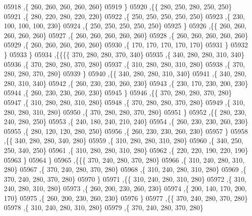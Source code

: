 \begin{DoxyCode}
05918     ,\{   260,   260,   260,   260,   260\}
05919     \}
05920    ,\{\{   280,   250,   280,   250,   250\}
05921     ,\{   280,   220,   280,   220,   220\}
05922     ,\{   250,   250,   250,   250,   250\}
05923     ,\{   230,   100,   100,   100,   230\}
05924     ,\{   250,   250,   250,   250,   250\}
05925     \}
05926    ,\{\{   260,   260,   260,   260,   260\}
05927     ,\{   260,   260,   260,   260,   260\}
05928     ,\{   260,   260,   260,   260,   260\}
05929     ,\{   260,   260,   260,   260,   260\}
05930     ,\{   170,   170,   170,   170,   170\}
05931     \}
05932    \}
05933   \}
05934  ,\{\{\{\{   370,   280,   280,   370,   340\}
05935     ,\{   340,   280,   280,   310,   340\}
05936     ,\{   370,   280,   280,   370,   280\}
05937     ,\{   310,   280,   280,   310,   280\}
05938     ,\{   370,   280,   280,   370,   280\}
05939     \}
05940    ,\{\{   340,   280,   280,   310,   340\}
05941     ,\{   340,   280,   280,   310,   340\}
05942     ,\{   260,   230,   230,   260,   230\}
05943     ,\{   230,   170,   230,   200,   230\}
05944     ,\{   260,   230,   230,   260,   230\}
05945     \}
05946    ,\{\{   370,   280,   280,   370,   280\}
05947     ,\{   310,   280,   280,   310,   280\}
05948     ,\{   370,   280,   280,   370,   280\}
05949     ,\{   310,   280,   280,   310,   280\}
05950     ,\{   370,   280,   280,   370,   280\}
05951     \}
05952    ,\{\{   280,   230,   240,   280,   250\}
05953     ,\{   240,   180,   240,   210,   240\}
05954     ,\{   260,   230,   230,   260,   230\}
05955     ,\{   280,   120,   120,   280,   250\}
05956     ,\{   260,   230,   230,   260,   230\}
05957     \}
05958    ,\{\{   340,   280,   280,   340,   280\}
05959     ,\{   310,   280,   280,   310,   280\}
05960     ,\{   340,   250,   250,   340,   250\}
05961     ,\{   310,   280,   280,   310,   280\}
05962     ,\{   220,   220,   190,   220,   190\}
05963     \}
05964    \}
05965   ,\{\{\{   370,   240,   280,   370,   280\}
05966     ,\{   310,   240,   280,   310,   280\}
05967     ,\{   370,   240,   280,   370,   280\}
05968     ,\{   310,   240,   280,   310,   280\}
05969     ,\{   370,   240,   280,   370,   280\}
05970     \}
05971    ,\{\{   310,   240,   280,   310,   280\}
05972     ,\{   310,   240,   280,   310,   280\}
05973     ,\{   260,   200,   230,   260,   230\}
05974     ,\{   200,   140,   170,   200,   170\}
05975     ,\{   260,   200,   230,   260,   230\}
05976     \}
05977    ,\{\{   370,   240,   280,   370,   280\}
05978     ,\{   310,   240,   280,   310,   280\}
05979     ,\{   370,   240,   280,   370,   280\}

\end{DoxyCode}
